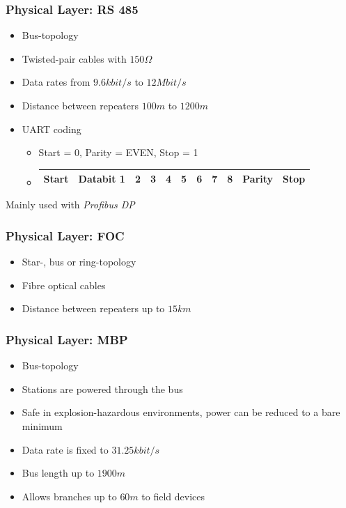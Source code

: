 \documentclass{beamer}
\begin{document}
\begin{frame}
  \frametitle{Physical Layer: RS 485}
  \begin{itemize}
    \item Bus-topology
    \item Twisted-pair cables with $150\Omega$
    \item Data rates from $9.6kbit/s$ to $12Mbit/s$
    \item Distance between repeaters $100m$ to $1200m$
    \item UART coding \\
      \footnotesize
      \begin{itemize}
        \item Start = 0, Parity = EVEN, Stop = 1 \\
        \item
          \begin{tabular}[h]{|c|c|c|c|c|c|c|c|c|c|c|}
            \hline
            Start & Databit 1 & 2 & 3 & 4 & 5 & 6 & 7 & 8 & Parity & Stop \\
            \hline
          \end{tabular}
      \end{itemize}
  \end{itemize}
  Mainly used with \textit{Profibus DP}
\end{frame}

\begin{frame}
  \frametitle{Physical Layer: FOC}
  \begin{itemize}
    \item Star-, bus or ring-topology
    \item Fibre optical cables
    \item Distance between repeaters up to $15km$
  \end{itemize}
\end{frame}

\begin{frame}
  \frametitle{Physical Layer: MBP}
  \begin{itemize}
    \item Bus-topology
    \item Stations are powered through the bus
    \item Safe in explosion-hazardous environments, power can be reduced to a bare minimum
    \item Data rate is fixed to $31.25kbit/s$
    \item Bus length up to $1900m$
    \item Allows branches up to $60m$ to field devices
  \end{itemize}
\end{frame}
\end{document}
